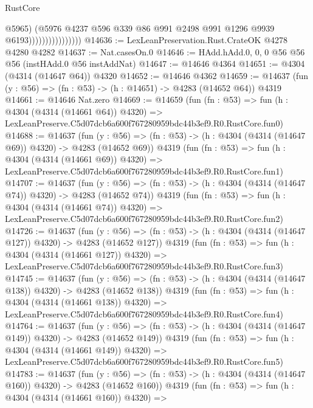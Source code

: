 \begin{lexlean}{RustCore}
\begin{coremodule}
                                    @5965)
                                  (@5976
                                    @4237
                                    @596
                                    @339
                                    @86
                                    @991
                                    @2498
                                    @991
                                    @1296
                                    @9939
                                    @6193))))))))))))))))
@14636 := LexLeanPreservation.Rust.CrateOK @4278 @4280 @4282
@14637 := Nat.casesOn.{0}
@14646 := HAdd.hAdd.{0, 0, 0} @56 @56 @56 (instHAdd.{0} @56 instAddNat)
@14647 := @14646 @4364
@14651 := @4304 (@4314 (@14647 @64)) @4320
@14652 := @14646 @4362
@14659 := @14637 (fun (y : @56) => (fn : @53) -> (h : @14651) -> @4283 (@14652 @64)) @4319
@14661 := @14646 Nat.zero
@14669 := @14659
    (fun (fn : @53) =>
    fun (h : @4304 (@4314 (@14661 @64)) @4320) =>
    LexLeanPreserve.C5d07dcb6a600f767280959bdc44b3ef9.R0.RustCore.fun0)
@14688 := @14637
    (fun (y : @56) => (fn : @53) -> (h : @4304 (@4314 (@14647 @69)) @4320) -> @4283 (@14652 @69))
    @4319
    (fun (fn : @53) =>
    fun (h : @4304 (@4314 (@14661 @69)) @4320) =>
    LexLeanPreserve.C5d07dcb6a600f767280959bdc44b3ef9.R0.RustCore.fun1)
@14707 := @14637
    (fun (y : @56) => (fn : @53) -> (h : @4304 (@4314 (@14647 @74)) @4320) -> @4283 (@14652 @74))
    @4319
    (fun (fn : @53) =>
    fun (h : @4304 (@4314 (@14661 @74)) @4320) =>
    LexLeanPreserve.C5d07dcb6a600f767280959bdc44b3ef9.R0.RustCore.fun2)
@14726 := @14637
    (fun (y : @56) => (fn : @53) -> (h : @4304 (@4314 (@14647 @127)) @4320) -> @4283 (@14652 @127))
    @4319
    (fun (fn : @53) =>
    fun (h : @4304 (@4314 (@14661 @127)) @4320) =>
    LexLeanPreserve.C5d07dcb6a600f767280959bdc44b3ef9.R0.RustCore.fun3)
@14745 := @14637
    (fun (y : @56) => (fn : @53) -> (h : @4304 (@4314 (@14647 @138)) @4320) -> @4283 (@14652 @138))
    @4319
    (fun (fn : @53) =>
    fun (h : @4304 (@4314 (@14661 @138)) @4320) =>
    LexLeanPreserve.C5d07dcb6a600f767280959bdc44b3ef9.R0.RustCore.fun4)
@14764 := @14637
    (fun (y : @56) => (fn : @53) -> (h : @4304 (@4314 (@14647 @149)) @4320) -> @4283 (@14652 @149))
    @4319
    (fun (fn : @53) =>
    fun (h : @4304 (@4314 (@14661 @149)) @4320) =>
    LexLeanPreserve.C5d07dcb6a600f767280959bdc44b3ef9.R0.RustCore.fun5)
@14783 := @14637
    (fun (y : @56) => (fn : @53) -> (h : @4304 (@4314 (@14647 @160)) @4320) -> @4283 (@14652 @160))
    @4319
    (fun (fn : @53) =>
    fun (h : @4304 (@4314 (@14661 @160)) @4320) =>

\end{coremodule}
\end{lexlean}
